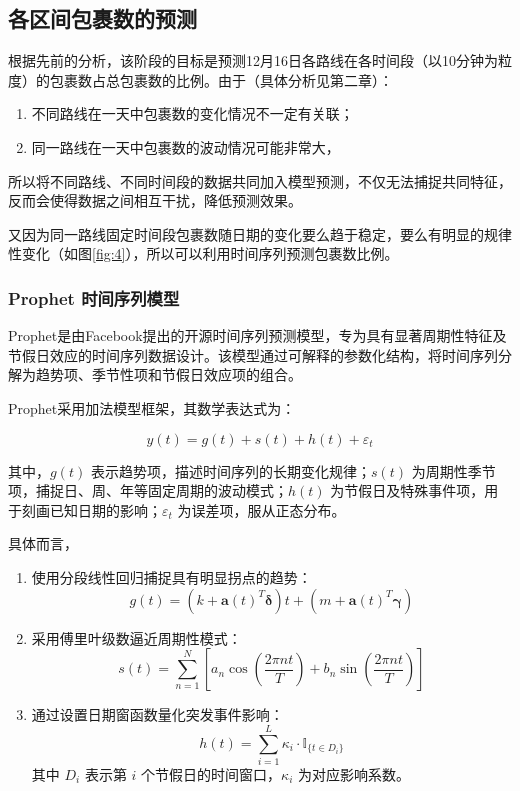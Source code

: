 \documentclass{MMCStyle}
\begin{document}
\subsection{各区间包裹数的预测}
根据先前的分析，该阶段的目标是预测12月16日各路线在各时间段（以10分钟为粒度）的包裹数占总包裹数的比例。由于（具体分析见第二章）：
\begin{enumerate}
    \item 不同路线在一天中包裹数的变化情况不一定有关联；
    \item 同一路线在一天中包裹数的波动情况可能非常大，
\end{enumerate}
所以将不同路线、不同时间段的数据共同加入模型预测，不仅无法捕捉共同特征，反而会使得数据之间相互干扰，降低预测效果。

又因为同一路线固定时间段包裹数随日期的变化要么趋于稳定，要么有明显的规律性变化（如图\ref{fig:4}），所以可以利用时间序列预测包裹数比例。

\subsubsection{Prophet 时间序列模型}

Prophet是由Facebook提出的开源时间序列预测模型，专为具有显著周期性特征及节假日效应的时间序列数据设计。该模型通过可解释的参数化结构，将时间序列分解为趋势项、季节性项和节假日效应项的组合。
  
Prophet采用加法模型框架，其数学表达式为： 

\begin{equation}
    y(t) = g(t) + s(t) + h(t) + \varepsilon_t
\end{equation}

其中，\( g(t) \) 表示趋势项，描述时间序列的长期变化规律；\( s(t) \) 为周期性季节项，捕捉日、周、年等固定周期的波动模式；\( h(t) \) 为节假日及特殊事件项，用于刻画已知日期的影响；\( \varepsilon_t \) 为误差项，服从正态分布。

具体而言，
\begin{enumerate}
    \item 使用分段线性回归捕捉具有明显拐点的趋势：
    \begin{equation}
             g(t) = \left( k + \boldsymbol{a}(t)^T \boldsymbol{\delta} \right) t + \left( m + \boldsymbol{a}(t)^T \boldsymbol{\gamma} \right)
    \end{equation}
    \item 采用傅里叶级数逼近周期性模式：
    \begin{equation}
          s(t) = \sum_{n=1}^N \left[ a_n \cos\left(\frac{2\pi n t}{T}\right) + b_n \sin\left(\frac{2\pi n t}{T}\right) \right]
    \end{equation}
    \item 通过设置日期窗函数量化突发事件影响：
    \begin{equation}
        h(t) = \sum_{i=1}^L \kappa_i \cdot \mathbb{I}_{\{ t \in D_i \}}
    \end{equation}
    其中 \( D_i \) 表示第 \( i \) 个节假日的时间窗口，\( \kappa_i \) 为对应影响系数。
\end{enumerate}
 
\end{document}
